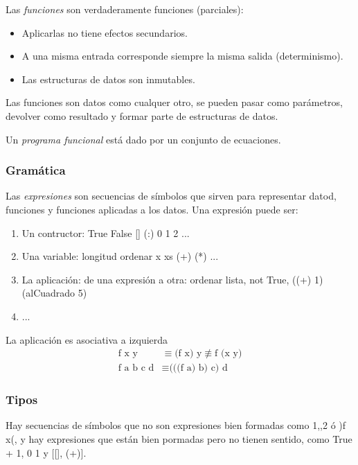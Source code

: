 \documentclass[12pt]{extarticle}
\begin{document}
Las \textit{funciones} son verdaderamente funciones (parciales):
\begin{itemize}
\itemsep-0.35em 
\item Aplicarlas no tiene efectos secundarios.
\item A una misma entrada corresponde siempre la misma salida (determinismo).
\item Las estructuras de datos son inmutables.
\end{itemize}

Las funciones son datos como cualquer otro, se pueden pasar como parámetros, devolver como resultado y formar parte de estructuras de datos.

Un \textit{programa funcional} está dado por un conjunto de ecuaciones.

\subsubsection{Gramática}
Las \textit{expresiones} son secuencias de símbolos que sirven para representar datod, funciones y funciones aplicadas a los datos. Una expresión puede ser:

\begin{enumerate}
\itemsep-0.35em 
\item Un contructor: True False [] (:) 0 1 2 ...
\item Una variable: longitud ordenar x xs (+) (*) ...
\item La aplicación: de una expresión a otra: ordenar lista,  not True,  ((+) 1) (alCuadrado 5)
\item ...
\end{enumerate}

La aplicación es asociativa a izquierda
\begin{equation}
\begin{split}
\text{f x y} & \equiv \text{(f x) y} 
\not\equiv \text{f (x y)} \\
\text{f a b c d} & \equiv \text{(((f a) b) c) d}
\end{split}
\end{equation}

\subsubsection{Tipos}
Hay secuencias de símbolos  que no son expresiones bien formadas como 1,,2 ó )f x(, y hay expresiones que están bien pormadas pero no tienen sentido, como True + 1, 0 1 y [[], (+)].
\end{document}
